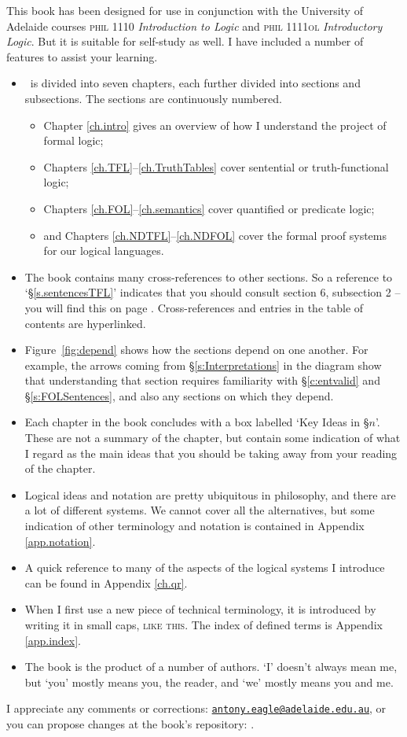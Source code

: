 This book has been designed for use in conjunction with the University of Adelaide courses \textsc{phil} 1110 \emph{Introduction to Logic} and \textsc{phil 1111ol} \emph{Introductory Logic}. But it is suitable for self-study as well. I have included a number of features to assist your learning. \begin{itemize}
	\item \forallx\ is divided into seven chapters, each further divided into sections and subsections. The sections are continuously numbered. \begin{itemize}
		\item Chapter \ref{ch.intro} gives an overview of how I understand the project of formal logic;
		\item Chapters \ref{ch.TFL}–\ref{ch.TruthTables} cover sentential or truth-functional logic;
		\item Chapters \ref{ch.FOL}–\ref{ch.semantics} cover quantified or predicate logic;
		\item and Chapters \ref{ch.NDTFL}–\ref{ch.NDFOL} cover the formal proof systems for our logical languages.
	\end{itemize}
	\item The book contains many cross-references to other sections. So a reference to `§\ref{s.sentencesTFL}' indicates that you should consult section 6, subsection 2 – you will find this on page \pageref{s.sentencesTFL}. Cross-references and entries in the table of contents are hyperlinked.
	\item  Figure~\ref{fig:depend} shows how the sections depend on one another. For example, the arrows coming from §\ref{s:Interpretations} in the diagram show that understanding that section requires familiarity with §\ref{c:entvalid} and §\ref{s:FOLSentences}, and also any sections on which they depend.
	\item Each chapter in the book concludes with a box labelled `Key Ideas in §$n$'. These are not a summary of the chapter, but contain some indication of what I regard as the main ideas that you should be taking away from your reading of the chapter. 
	\item Logical ideas and notation are pretty ubiquitous in philosophy, and there are a lot of different systems. We cannot cover all the alternatives, but some indication of other terminology and notation is contained in Appendix \ref{app.notation}.
	\item A quick reference to many of the aspects of the logical systems I introduce can be found in Appendix \ref{ch.qr}.
	\item When I first use a new piece of technical terminology, it is introduced by writing it in small caps, \textsc{like this}. The index of defined terms is Appendix \ref{app.index}.
	\item The book is the product of a number of authors. `I' doesn't always mean me, but `you' mostly means you, the reader, and `we' mostly means you and me.
\end{itemize}
I appreciate any comments or corrections: \href{mailto:antony.eagle@adelaide.edu.au}{\nolinkurl{antony.eagle@adelaide.edu.au}}, or you can propose changes at the book's repository: .

